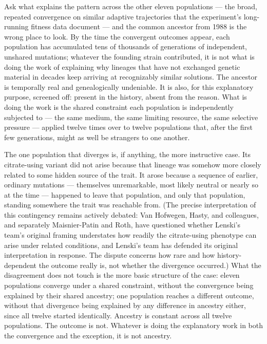 \documentclass[11pt]{article}
\theoremstyle{plain}
\begin{document}
Ask what explains the pattern across the other eleven populations --- the broad, repeated convergence on similar adaptive trajectories that the experiment's long-running fitness data document --- and the common ancestor from 1988 is the wrong place to look. By the time the convergent outcomes appear, each population has accumulated tens of thousands of generations of independent, unshared mutations; whatever the founding strain contributed, it is not what is doing the work of explaining why lineages that have not exchanged genetic material in decades keep arriving at recognizably similar solutions. The ancestor is temporally real and genealogically undeniable. It is also, for this explanatory purpose, screened off: present in the history, absent from the reason. What is doing the work is the shared constraint each population is independently subjected to --- the same medium, the same limiting resource, the same selective pressure --- applied twelve times over to twelve populations that, after the first few generations, might as well be strangers to one another.

The one population that diverges is, if anything, the more instructive case. Its citrate-using variant did not arise because that lineage was somehow more closely related to some hidden source of the trait. It arose because a sequence of earlier, ordinary mutations --- themselves unremarkable, most likely neutral or nearly so at the time --- happened to leave that population, and only that population, standing somewhere the trait was reachable from. (The precise interpretation of this contingency remains actively debated: Van Hofwegen, Hasty, and colleagues, and separately Maisnier-Patin and Roth, have questioned whether Lenski's team's original framing understates how readily the citrate-using phenotype can arise under related conditions, and Lenski's team has defended its original interpretation in response. The dispute concerns how rare and how history-dependent the outcome really is, not whether the divergence occurred.) What the disagreement does not touch is the more basic structure of the case: eleven populations converge under a shared constraint, without the convergence being explained by their shared ancestry; one population reaches a different outcome, without that divergence being explained by any difference in ancestry either, since all twelve started identically. Ancestry is constant across all twelve populations. The outcome is not. Whatever is doing the explanatory work in both the convergence and the exception, it is not ancestry.
\end{document}
